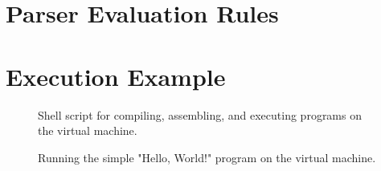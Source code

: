 \documentclass[12pt, twoside]{report}
\begin{document}
  \clearpage
  \appendix

  \chapter{Parser Evaluation Rules} \label{parser-lib}
    
  
  \chapter{Execution Example} \label{run-example}
    \begin{figure}[H]
      
      \caption{
        Shell script for compiling, assembling, and executing programs on the
        virtual machine.
      }
      \label{run-sh}
    \end{figure}
    \begin{figure}[H]
      
      \caption{
        Running the simple "Hello, World!" program on the virtual machine.
      }
    \end{figure}
\end{document}

